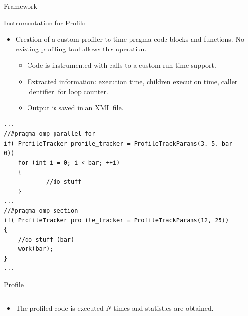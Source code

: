 \documentclass[xcolor=dvipsnames]{beamer}
\begin{document}
\begin{section}{Framework}














\begin{frame}[fragile]{\hskip 0.3cm Instrumentation for Profile}

\begin{itemize}
\item Creation of a custom profiler to time pragma code blocks and functions.  No existing profiling tool allows this operation.

\begin{itemize}

\item Code is instrumented with calls to a custom run-time support.

\item Extracted information: execution time, children execution time, caller identifier, for loop counter.

\item Output is saved in an XML file.

\end{itemize}
\end{itemize}
\begin{lstlisting}[language=CCC]
...
//#pragma omp parallel for
if( ProfileTracker profile_tracker = ProfileTrackParams(3, 5, bar - 0))
	for (int i = 0; i < bar; ++i)
	{
    		//do stuff
	}
...
//#pragma omp section
if( ProfileTracker profile_tracker = ProfileTrackParams(12, 25))
{
    //do stuff (bar)
    work(bar);
}
...
\end{lstlisting}

\end{frame}












\begin{frame}{\hskip 0.3cm Profile}

\begin{columns}

\begin{column}{5cm}
\begin{itemize}

\item The profiled code is executed $N$ times and statistics are obtained. 


\end{itemize}
\end{column}
\end{columns}
\end{frame}
\end{section}
\end{document}
